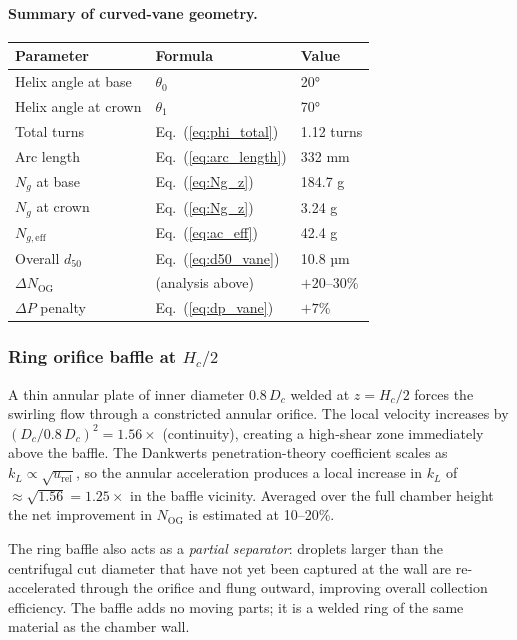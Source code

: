 \documentclass[11pt,letterpaper]{article}
\begin{document}
\paragraph{Summary of curved-vane geometry.}
\begin{center}
\begin{tabular}{lll}
\toprule
Parameter & Formula & Value \\
\midrule
Helix angle at base   & $\theta_0$                    & 20° \\
Helix angle at crown  & $\theta_1$                    & 70° \\
Total turns           & Eq.~(\ref{eq:phi_total})      & 1.12 turns \\
Arc length            & Eq.~(\ref{eq:arc_length})     & 332 mm \\
$N_g$ at base         & Eq.~(\ref{eq:Ng_z})           & 184.7 g \\
$N_g$ at crown        & Eq.~(\ref{eq:Ng_z})           & 3.24 g \\
$N_{g,\mathrm{eff}}$  & Eq.~(\ref{eq:ac_eff})         & 42.4 g \\
Overall $d_{50}$      & Eq.~(\ref{eq:d50_vane})       & 10.8 µm \\
$\Delta N_{\mathrm{OG}}$ & (analysis above)           & $+20$--$30$\% \\
$\Delta P$ penalty    & Eq.~(\ref{eq:dp_vane})        & $+7$\% \\
\bottomrule
\end{tabular}
\end{center}

\subsubsection{Ring orifice baffle at $H_c/2$}

A thin annular plate of inner diameter $0.8\,D_c$ welded at
$z = H_c/2$ forces the swirling flow through a constricted annular
orifice.  The local velocity increases by $(D_c/0.8\,D_c)^2 = 1.56\times$
(continuity), creating a high-shear zone immediately above the baffle.
The Dankwerts penetration-theory coefficient scales as $k_L \propto
\sqrt{u_{\mathrm{rel}}}$, so the annular acceleration produces a local
increase in $k_L$ of $\approx\!\sqrt{1.56} = 1.25\times$ in the baffle
vicinity.  Averaged over the full chamber height the net improvement in
$N_{\mathrm{OG}}$ is estimated at 10--20\%.

The ring baffle also acts as a \emph{partial separator}: droplets
larger than the centrifugal cut diameter that have not yet been captured
at the wall are re-accelerated through the orifice and flung outward,
improving overall collection efficiency.  The baffle adds no moving
parts; it is a welded ring of the same material as the chamber wall.
\end{document}
